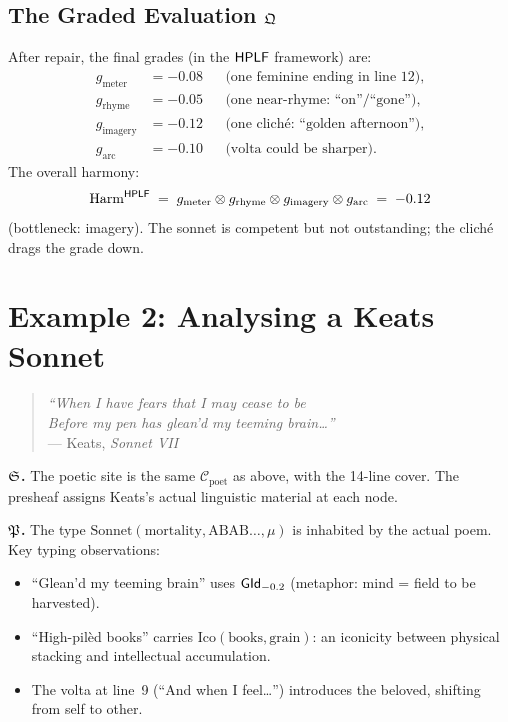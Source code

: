 \subsection{The Graded Evaluation $\mathfrak{Q}$}

After repair, the final grades (in the $\mathsf{HPLF}$ framework) are:
\begin{align*}
  g_{\mathrm{meter}}   &= -0.08  &&\text{(one feminine ending in line 12)},\\
  g_{\mathrm{rhyme}}   &= -0.05  &&\text{(one near-rhyme: ``on''/``gone'')},\\
  g_{\mathrm{imagery}} &= -0.12  &&\text{(one clich\'e: ``golden afternoon'')},\\
  g_{\mathrm{arc}}     &= -0.10  &&\text{(volta could be sharper)}.
\end{align*}
The overall harmony:
\[
  \mathrm{Harm}^{\mathsf{HPLF}}
  \;=\;
  g_{\mathrm{meter}} \otimes g_{\mathrm{rhyme}} \otimes
  g_{\mathrm{imagery}} \otimes g_{\mathrm{arc}}
  \;=\; -0.12
\]
(bottleneck: imagery).  The sonnet is competent but not
outstanding; the clich\'e drags the grade down.

\medskip

\section{Example 2: Analysing a Keats Sonnet}
\label{sec:keats}

\begin{quote}
\emph{``When I have fears that I may cease to be \\
Before my pen has glean'd my teeming brain\ldots''}\\
\hfill --- Keats, \emph{Sonnet VII}
\end{quote}

\textbf{$\mathfrak{S}$.}\quad
The poetic site is the same $\mathcal{C}_{\mathrm{poet}}$ as above,
with the 14-line cover.  The presheaf assigns Keats's actual
linguistic material at each node.

\textbf{$\mathfrak{P}$.}\quad
The type $\mathrm{Sonnet}(\text{mortality},\text{ABAB}\ldots,\mu)$
is inhabited by the actual poem.  Key typing observations:
\begin{itemize}[nosep]
  \item ``Glean'd my teeming brain'' uses $\mathsf{GId}_{-0.2}$
    (metaphor: mind = field to be harvested).
  \item ``High-pil\`ed books'' carries
    $\mathrm{Ico}(\text{books},\text{grain})$: an iconicity between
    physical stacking and intellectual accumulation.
  \item The volta at line~9 (``And when I feel\ldots'') introduces
    the beloved, shifting from self to other.
\end{itemize}

